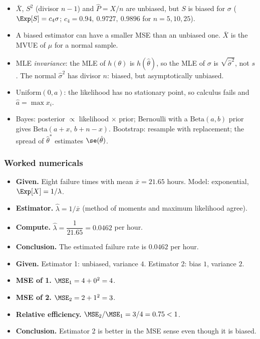 \begin{notebox}
\begin{itemize}
  \item $\bar{X}$, $S^2$ (divisor $n-1$) and $\hat{P}=X/n$ are unbiased, but $S$ is biased for $\sigma$ ($\Exp[S]=c_4\sigma$; $c_4=0.94,\ 0.9727,\ 0.9896$ for $n=5,10,25$).
  \item A biased estimator can have a smaller MSE than an unbiased one. $\bar{X}$ is the MVUE of $\mu$ for a normal sample.
  \item MLE \emph{invariance}: the MLE of $h(\theta)$ is $h(\hat\theta)$, so the MLE of $\sigma$ is $\sqrt{\hat\sigma^2}$, not $s$. The normal $\hat\sigma^2$ has divisor $n$: biased, but asymptotically unbiased.
  \item Uniform$(0,a)$: the likelihood has no stationary point, so calculus fails and $\hat{a}=\max x_i$.
  \item Bayes: posterior $\propto$ likelihood $\times$ prior; Bernoulli with a $\mathrm{Beta}(a,b)$ prior gives $\mathrm{Beta}(a+x,\,b+n-x)$. Bootstrap: resample with replacement; the spread of $\hat\theta^*$ estimates $\se(\hat\theta)$.
\end{itemize}
\end{notebox}

\subsubsection*{Worked numericals}

\begin{example}
\begin{itemize}
  \item \textbf{Given.} Eight failure times with mean $\bar{x}=21.65$ hours. Model: exponential, $\Exp[X]=1/\lambda$.
  \item \textbf{Estimator.} $\hat\lambda=1/\bar{x}$ (method of moments and maximum likelihood agree).
  \item \textbf{Compute.} $\hat\lambda=\dfrac{1}{21.65}=0.0462$ per hour.
  \item \textbf{Conclusion.} The estimated failure rate is $0.0462$ per hour.
\end{itemize}
\end{example}

\begin{example}
\begin{itemize}
  \item \textbf{Given.} Estimator 1: unbiased, variance $4$. Estimator 2: bias $1$, variance $2$.
  \item \textbf{MSE of 1.} $\MSE_1=4+0^2=4$.
  \item \textbf{MSE of 2.} $\MSE_2=2+1^2=3$.
  \item \textbf{Relative efficiency.} $\MSE_2/\MSE_1=3/4=0.75<1$.
  \item \textbf{Conclusion.} Estimator 2 is better in the MSE sense even though it is biased.
\end{itemize}
\end{example}

